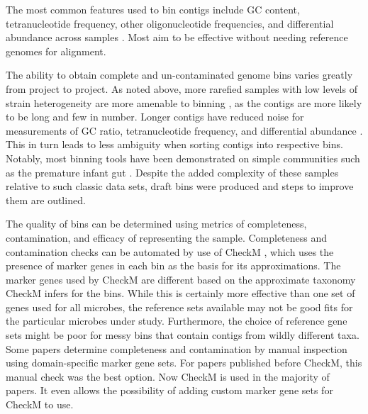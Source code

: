The most common features used to bin contigs include GC content, tetranucleotide frequency, other oligonucleotide frequencies, and differential abundance across samples \cite{sangwan2016}.
Most aim to be effective without needing reference genomes for alignment.

The ability to obtain complete and un-contaminated genome bins varies greatly from project to project.
As noted above, more rarefied samples with low levels of strain heterogeneity are more amenable to binning \cite{kunin2008, thomas2012}, as the contigs are more likely to be long and few in number.
Longer contigs have reduced noise for measurements of GC ratio, tetranucleotide frequency, and differential abundance \cite{sangwan2016}.
This in turn leads to less ambiguity when sorting contigs into respective bins.
Notably, most binning tools have been demonstrated on simple communities such as the premature infant gut \cite{sharon2013}.
Despite the added complexity of these samples relative to such classic data sets, draft bins were produced and steps to improve them are outlined.

The quality of bins can be determined using metrics of completeness, contamination, and efficacy of representing the sample.
Completeness and contamination checks can be automated by use of CheckM \cite{parks2015}, which uses the presence of marker genes in each bin as the basis for its approximations.
The marker genes used by CheckM are different based on the approximate taxonomy CheckM infers for the bins.
While this is certainly more effective than one set of genes used for all microbes, the reference sets available may not be good fits for the particular microbes under study.
Furthermore, the choice of reference gene sets might be poor for messy bins that contain contigs from wildly different taxa.
Some papers determine completeness and contamination by manual inspection using domain-specific marker gene sets. %
For papers published before CheckM, this manual check was the best option.
Now CheckM is used in the majority of papers.
It even allows the possibility of adding custom marker gene sets for CheckM to use.

